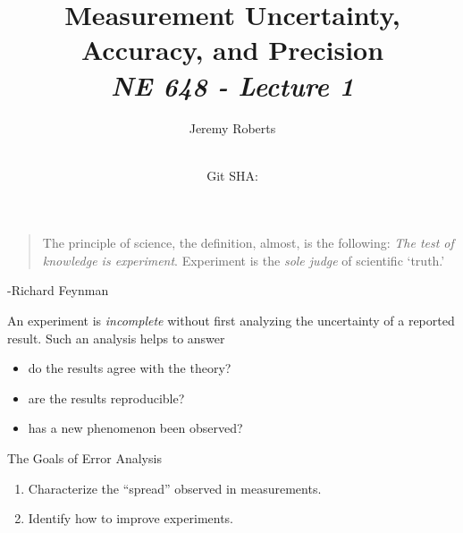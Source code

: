 \documentclass[aspectratio=1610]{beamer}
\title{Measurement Uncertainty, \\ Accuracy, and Precision\\
       {\small\it NE 648 - Lecture 1}}
\date{ \\ {\footnotesize Git SHA: }}
\author{Jeremy Roberts}
\begin{document}
\begin{frame}
\titlepage
\end{frame}


\begin{frame}{}

\begin{quote}
\textcolor{wcprimary}{The principle of science, the definition, almost, is the following: {\it The test of knowledge is experiment}. Experiment is the {\it sole judge} of scientific `truth.'}
\end{quote}
\hfill  -Richard Feynman 

\vfill

\pause 

An experiment is {\it incomplete} without first analyzing the uncertainty of a reported result. \pause  Such an analysis helps to answer 
\begin{itemize}
    \item[$\ldots$] do the results agree with the theory?
    \item[$\ldots$] are the results reproducible?
    \item[$\ldots$] has a new phenomenon been observed?
\end{itemize}

\end{frame}

\begin{frame}{The Goals of Error Analysis}

\begin{enumerate}
    \item Characterize the ``spread'' observed in measurements.
    \item Identify how to improve experiments.
\end{enumerate}

\end{frame}
\end{document}

